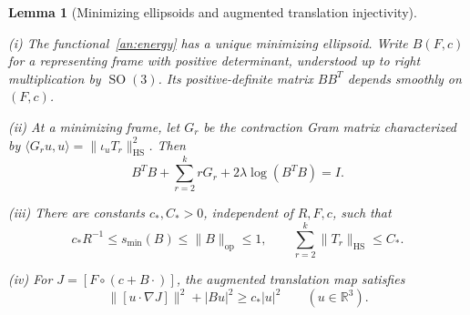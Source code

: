 \documentclass[11pt]{amsart}
\newtheorem{lemma}[theorem]{Lemma}
\theoremstyle{definition}
\theoremstyle{remark}
\numberwithin{equation}{section}
\begin{document}
\begin{lemma}[Minimizing ellipsoids and augmented translation injectivity]\label{an:minimizer}

\leavevmode\noindent\textup{(i)} The functional~\eqref{an:energy} has a unique minimizing ellipsoid. Write $B(F,c)$ for a representing frame with positive determinant, understood up to right multiplication by $\operatorname{SO}(3)$. Its positive-definite matrix $BB^T$ depends smoothly on $(F,c)$.

\noindent\textup{(ii)} At a minimizing frame, let $G_r$ be the contraction Gram matrix characterized by $\langle G_ru,u\rangle=\|\iota_uT_r\|_{\mathrm{HS}}^2$. Then
\begin{equation}\label{an:balance}
B^TB+\sum_{r=2}^krG_r+2\lambda\log(B^TB)=I.
\end{equation}

\noindent\textup{(iii)} There are constants $c_*,C_*>0$, independent of $R,F,c$, such that
\begin{equation}\label{an:frame-bounds}
c_*R^{-1}\le s_{\min}(B)\le\|B\|_{\mathrm{op}}\le1,\qquad \sum_{r=2}^k\|T_r\|_{\mathrm{HS}}\le C_*.
\end{equation}

\noindent\textup{(iv)} For $J=[F\circ(c+B\cdot)]$, the augmented translation map satisfies
\begin{equation}\label{an:translation-stop}
\|[u\cdot\nabla J]\|^2+|Bu|^2\ge c_*|u|^2\qquad(u\in\mathbb R^3).
\end{equation}
\end{lemma}
\end{document}
